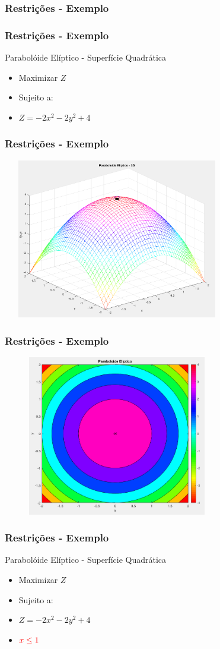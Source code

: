 \documentclass{beamer}
\begin{document}
\begin{frame}
	\frametitle{Restrições - Exemplo}
	{
		\frametitle{Restrições - Exemplo}
		\begin{block}{Parabolóide Elíptico - Superfície Quadrática}
			\begin{itemize}
			\item Maximizar $Z$
			\item Sujeito a:
			\item $Z = -2x^2 - 2y^2 + 4$
			\end{itemize}
		\end{block}
	}
	{ 
		\frametitle{Restrições - Exemplo}
		\includegraphics[width=10cm,height=7cm]{restricoes1.png}
	}
	{ 
		\frametitle{Restrições - Exemplo}
		\includegraphics[width=10cm,height=7cm]{restricoes2.png}
	}
	{
		\frametitle{Restrições - Exemplo}
		\begin{block}{Parabolóide Elíptico - Superfície Quadrática}
			\begin{itemize}
			\item Maximizar $Z$
			\item Sujeito a:
			\item $Z = -2x^2 - 2y^2 + 4$
			\item $\color{red} x \le 1 $

\end{itemize}
\end{block}}
\end{frame}
\end{document}

